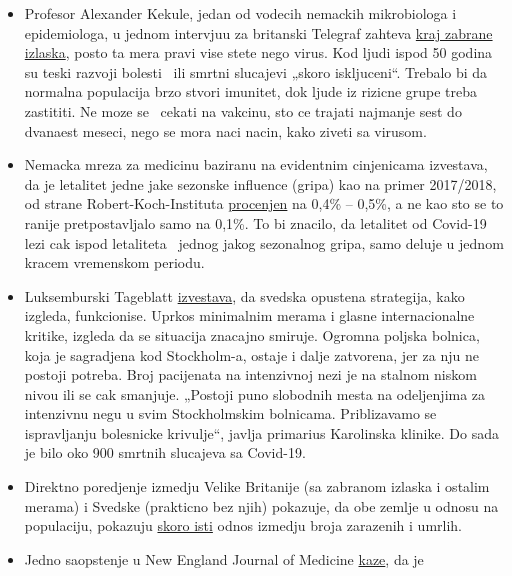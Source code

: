 \begin{itemize}
\tightlist
\item
  Profesor Alexander Kekule, jedan od vodecih nemackih mikrobiologa i
  epidemiologa, u jednom intervjuu za britanski Telegraf zahteva
  \href{https://www.telegraph.co.uk/news/2020/04/11/german-scientist-predicted-european-epidemic-calls-end-lockdown/}{kraj
  zabrane izlaska}, posto ta mera pravi vise stete nego virus. Kod ljudi
  ispod 50 godina su teski razvoji bolesti ~ili smrtni slucajevi „skoro
  iskljuceni``. Trebalo bi da normalna populacija brzo stvori imunitet,
  dok ljude iz rizicne grupe treba zastititi. Ne moze se ~cekati na
  vakcinu, sto ce trajati najmanje sest do dvanaest meseci, nego se mora
  naci nacin, kako ziveti sa virusom.
\item
  Nemacka mreza za medicinu baziranu na evidentnim cinjenicama
  izvestava, da je letalitet jedne jake sezonske influence (gripa) kao
  na primer 2017/2018, od strane Robert-Koch-Instituta
  \href{https://www.ebm-netzwerk.de/en/publications/covid-19}{procenjen}
  na 0,4\% -- 0,5\%, a ne kao sto se to ranije pretpostavljalo samo na
  0,1\%. To bi znacilo, da letalitet od Covid-19 lezi cak ispod
  letaliteta ~jednog jakog sezonalnog gripa, samo deluje u jednom kracem
  vremenskom periodu.
\item
  Luksemburski Tageblatt
  \href{https://swprs.files.wordpress.com/2020/04/volksblatt_schweden_corona_20200414_18.pdf}{izvestava},
  da svedska opustena strategija, kako izgleda, funkcionise. Uprkos
  minimalnim merama i glasne internacionalne kritike, izgleda da se
  situacija znacajno smiruje. Ogromna poljska bolnica, koja je
  sagradjena kod Stockholm-a, ostaje i dalje zatvorena, jer za nju ne
  postoji potreba. Broj pacijenata na intenzivnoj nezi je na stalnom
  niskom nivou ili se cak smanjuje. „Postoji puno slobodnih mesta na
  odeljenjima za intenzivnu negu u svim Stockholmskim bolnicama.
  Priblizavamo se ispravljanju bolesnicke krivulje``, javlja primarius
  Karolinska klinike. Do sada je bilo oko 900 smrtnih slucajeva sa
  Covid-19.
\item
  Direktno poredjenje izmedju Velike Britanije (sa zabranom izlaska i
  ostalim merama) i Svedske (prakticno bez njih) pokazuje, da obe zemlje
  u odnosu na populaciju, pokazuju
  \href{http://www.theblogmire.com/a-comparison-of-lockdown-uk-with-non-lockdown-sweden/}{skoro
  isti} odnos izmedju broja zarazenih i umrlih.
\item
  Jedno saopstenje u New England Journal of Medicine
  \href{https://www.nejm.org/doi/full/10.1056/NEJMc2009316}{kaze}, da je

\end{itemize}
